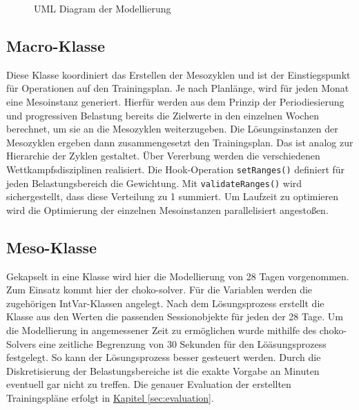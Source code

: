\begin{figure}[h]
    \caption{UML Diagram der Modellierung}
    \label{fig:uml:solver}
\end{figure}

\subsection{Macro-Klasse}
Diese Klasse koordiniert das Erstellen der Mesozyklen und ist der Einstiegspunkt für Operationen auf den Trainingsplan. Je nach Planlänge, wird für jeden Monat eine Mesoinstanz generiert. Hierfür werden aus dem Prinzip der Periodiesierung und progressiven Belastung bereits die Zielwerte in den einzelnen Wochen berechnet, um sie an die Mesozyklen weiterzugeben.
Die Lösungsinstanzen der Mesozyklen ergeben dann zusammengesetzt den Trainingsplan. Das ist analog zur Hierarchie der Zyklen gestaltet. \newline
Über Vererbung werden die verschiedenen Wettkampfsdisziplinen realisiert. Die Hook-Operation \texttt{setRanges()} definiert für jeden Belastungsbereich die Gewichtung. Mit \texttt{validateRanges()} wird sichergestellt, dass diese Verteilung zu 1 summiert. 
Um Laufzeit zu optimieren wird die Optimierung der einzelnen Mesoinstanzen parallelisiert angestoßen.

\subsection{Meso-Klasse}
Gekapselt in eine Klasse wird hier die Modellierung von 28 Tagen vorgenommen. Zum Einsatz kommt hier der choko-solver. Für die Variablen werden die zugehörigen IntVar-Klassen angelegt.  
Nach dem Lösungsprozess erstellt die Klasse aus den Werten die passenden Sessionobjekte für jeden der 28 Tage.
Um die Modellierung in angemessener Zeit zu ermöglichen wurde mithilfe des choko-Solvers eine zeitliche Begrenzung von 30 Sekunden für den Löäsungsprozess festgelegt. So kann der Lösungsprozess besser gesteuert werden. Durch die Diskretisierung der Belastungsbereiche ist die exakte Vorgabe an Minuten eventuell gar nicht zu treffen. Die genauer Evaluation der erstellten Trainingspläne erfolgt in \hyperref[sec:evaluation]{Kapitel \ref{sec:evaluation}}.

